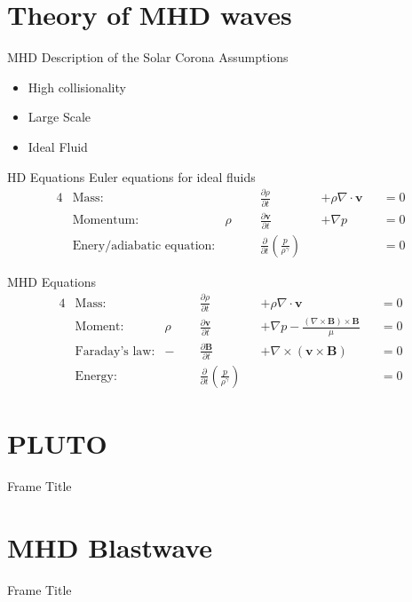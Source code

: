 \documentclass{beamer}
\begin{document}
\section{Theory of MHD waves}
\begin{frame}{MHD Description of the Solar Corona}
    \centering
    Assumptions
    \begin{itemize}
        \item High collisionality
        \item Large Scale
        \item Ideal Fluid
    \end{itemize}
\end{frame}
\begin{frame}{HD Equations}
Euler equations for ideal fluids
\begin{alignat*}{4}
	&\text{Mass:} &\quad\quad &\frac{\partial \rho}{\partial t} & &+ \rho \nabla \cdot \mathbf v & &=  0 \\
	&\text{Momentum:} & \rho& \frac{\partial \mathbf v}{\partial t} & &+ \nabla p & &= 0\\
	&\text{Enery/adiabatic equation:} & &\frac{\partial }{\partial t} \left( \frac{p}{\rho^{\gamma}} \right)  & & & &= 0
\end{alignat*}
\end{frame}
\begin{frame}{MHD Equations}
    \begin{alignat*}{4}
	&\text{Mass:} &\quad\quad &\frac{\partial \rho}{\partial t} & & +\rho \nabla \cdot \mathbf v& &= 0 \\ 	
	&\text{Moment:} & \rho& \frac{\partial \mathbf v}{\partial t} & &+ \nabla p - \frac{(\nabla \times \mathbf B) \times \mathbf B}{\mu}& &=  0  \\
	&\text{Faraday's law:} & -&\frac{\partial \mathbf B}{\partial t} & &+ \nabla \times (\mathbf v \times \mathbf B)& &= 0 \\
	&\text{Energy:} & &\frac{\partial }{\partial t} \left( \frac{p}{\rho^{\gamma}} \right)  & & & &= 0 
\end{alignat*}

\end{frame}
\section{PLUTO}
\begin{frame}{Frame Title}
    
\end{frame}
\section{MHD Blastwave}
\begin{frame}{Frame Title}
    
\end{frame}
\end{document}

